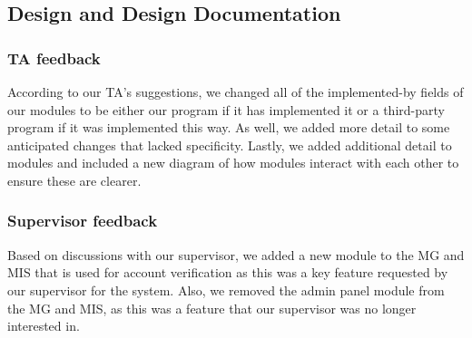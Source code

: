 \documentclass{article}
\begin{document}
\subsection{Design and Design Documentation}

\subsubsection{TA feedback}
According to our TA's suggestions, we changed all of the implemented-by fields of our modules to be either our program if it has implemented it or a third-party program if it was implemented this way. As well, we added more detail to some anticipated changes that lacked specificity. Lastly, we added additional detail to modules and included a new diagram of how modules interact with each other to ensure these are clearer. 

\subsubsection{Supervisor feedback}
Based on discussions with our supervisor, we added a new module to the MG and MIS that is used for account verification as this was a key feature requested by our supervisor for the system. Also, we removed the admin panel module from the MG and MIS, as this was a feature that our supervisor was no longer interested in. 
\end{document}
